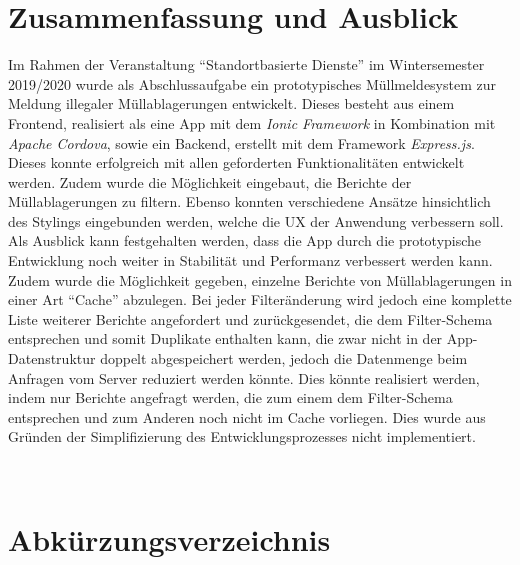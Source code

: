 \documentclass[a4paper, 11pt, DIV=11, listof=numbered, numbers=noenddot]{scrartcl}
\begin{document}
	\section{Zusammenfassung und Ausblick}
	Im Rahmen der Veranstaltung \enquote{Standortbasierte Dienste} im Wintersemester 2019/2020 wurde als Abschlussaufgabe ein prototypisches Müllmeldesystem zur Meldung illegaler Müllablagerungen entwickelt.
	Dieses besteht aus einem Frontend, realisiert als eine App mit dem \textit{Ionic Framework} in Kombination mit \textit{Apache Cordova}, sowie ein Backend, erstellt mit dem Framework \textit{Express.js}.\\
	Dieses konnte erfolgreich mit allen geforderten Funktionalitäten entwickelt werden. Zudem wurde die Möglichkeit eingebaut, die Berichte der Müllablagerungen zu filtern.
	Ebenso konnten verschiedene Ansätze hinsichtlich des Stylings eingebunden werden, welche die UX der Anwendung verbessern soll.\\
	Als Ausblick kann festgehalten werden, dass die App durch die prototypische Entwicklung noch weiter in Stabilität und Performanz verbessert werden kann.
	Zudem wurde die Möglichkeit gegeben, einzelne Berichte von Müllablagerungen in einer Art \enquote{Cache} abzulegen. Bei jeder Filteränderung wird jedoch eine komplette Liste weiterer Berichte angefordert und zurückgesendet, die dem Filter-Schema entsprechen und somit Duplikate enthalten kann, die zwar nicht in der App-Datenstruktur doppelt abgespeichert werden, jedoch die Datenmenge beim Anfragen vom Server reduziert werden könnte.
	Dies könnte realisiert werden, indem nur Berichte angefragt werden, die zum einem dem Filter-Schema entsprechen und zum Anderen noch nicht im Cache vorliegen. Dies wurde aus Gründen der Simplifizierung des Entwicklungsprozesses nicht implementiert.

	\printbibliography

	\textbf{}\\
	\section*{Abkürzungsverzeichnis}
	\begin{acronym}[API]
	\end{acronym}
\end{document}
